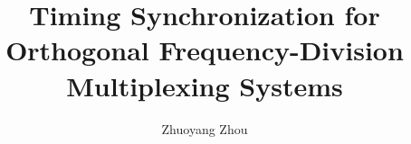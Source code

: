 \documentclass[12pt,twoside]{report}
\begin{document}
    \title{Timing Synchronization for Orthogonal
    Frequency-Division Multiplexing Systems}

    \author{Zhuoyang Zhou}

    \beforepreface




%



\afterpreface
















\end{document}
